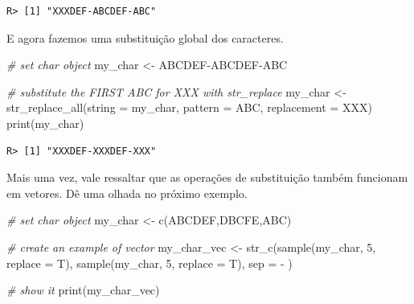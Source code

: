 \documentclass[
  11pt,
]{book}
\newenvironment{Shaded}{\begin{snugshade}}{\end{snugshade}}
\newcommand{\AttributeTok}[1]{\textcolor[rgb]{0.61,0.61,0.61}{#1}}
\newcommand{\CommentTok}[1]{\textcolor[rgb]{0.37,0.37,0.37}{\textit{#1}}}
\newcommand{\DecValTok}[1]{\textcolor[rgb]{0.06,0.06,0.06}{#1}}
\newcommand{\FunctionTok}[1]{\textcolor[rgb]{0,0,0}{#1}}
\newcommand{\NormalTok}[1]{#1}
\newcommand{\OtherTok}[1]{\textcolor[rgb]{0.37,0.37,0.37}{#1}}
\newcommand{\StringTok}[1]{\textcolor[rgb]{0.5,0.5,0.5}{#1}}
\begin{document}
\begin{verbatim}
R> [1] "XXXDEF-ABCDEF-ABC"
\end{verbatim}

E agora fazemos uma substituição global dos caracteres.

\begin{Shaded}
\begin{Highlighting}[]
\CommentTok{\# set char object}
\NormalTok{my\_char }\OtherTok{\textless{}{-}} \StringTok{\textquotesingle{}ABCDEF{-}ABCDEF{-}ABC\textquotesingle{}}

\CommentTok{\# substitute the FIRST \textquotesingle{}ABC\textquotesingle{} for \textquotesingle{}XXX\textquotesingle{} with str\_replace}
\NormalTok{my\_char }\OtherTok{\textless{}{-}} \FunctionTok{str\_replace\_all}\NormalTok{(}\AttributeTok{string =}\NormalTok{ my\_char,}
                           \AttributeTok{pattern =} \StringTok{\textquotesingle{}ABC\textquotesingle{}}\NormalTok{,}
                           \AttributeTok{replacement =} \StringTok{\textquotesingle{}XXX\textquotesingle{}}\NormalTok{)}
\FunctionTok{print}\NormalTok{(my\_char)}
\end{Highlighting}
\end{Shaded}

\begin{verbatim}
R> [1] "XXXDEF-XXXDEF-XXX"
\end{verbatim}

Mais uma vez, vale ressaltar que as operações de substituição também funcionam em vetores. Dê uma olhada no próximo exemplo.

\begin{Shaded}
\begin{Highlighting}[]
\CommentTok{\# set char object}
\NormalTok{my\_char }\OtherTok{\textless{}{-}} \FunctionTok{c}\NormalTok{(}\StringTok{\textquotesingle{}ABCDEF\textquotesingle{}}\NormalTok{,}\StringTok{\textquotesingle{}DBCFE\textquotesingle{}}\NormalTok{,}\StringTok{\textquotesingle{}ABC\textquotesingle{}}\NormalTok{)}

\CommentTok{\# create an example of vector}
\NormalTok{my\_char\_vec }\OtherTok{\textless{}{-}} \FunctionTok{str\_c}\NormalTok{(}\FunctionTok{sample}\NormalTok{(my\_char, }\DecValTok{5}\NormalTok{, }\AttributeTok{replace =}\NormalTok{ T),}
                     \FunctionTok{sample}\NormalTok{(my\_char, }\DecValTok{5}\NormalTok{, }\AttributeTok{replace =}\NormalTok{ T),}
                     \AttributeTok{sep =} \StringTok{\textquotesingle{} {-} \textquotesingle{}}\NormalTok{)}

\CommentTok{\# show it}
\FunctionTok{print}\NormalTok{(my\_char\_vec)}
\end{Highlighting}
\end{Shaded}
\end{document}
